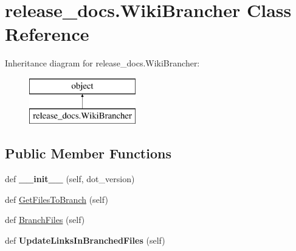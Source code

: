 \hypertarget{classrelease__docs_1_1_wiki_brancher}{}\section{release\+\_\+docs.\+Wiki\+Brancher Class Reference}
\label{classrelease__docs_1_1_wiki_brancher}
Inheritance diagram for release\+\_\+docs.\+Wiki\+Brancher\+:\begin{figure}[H]
\begin{center}
\leavevmode
\includegraphics[height=2.000000cm]{classrelease__docs_1_1_wiki_brancher}
\end{center}
\end{figure}
\subsection*{Public Member Functions}
\begin{DoxyCompactItemize}
\item 
\mbox{\label{classrelease__docs_1_1_wiki_brancher_a344b32e2b65f0e8bab9fbf1e670d33fd}} 
def {\bfseries \+\_\+\+\_\+init\+\_\+\+\_\+} (self, dot\+\_\+version)
\item 
def \mbox{\hyperlink{classrelease__docs_1_1_wiki_brancher_a05fc4282f501fb0210ecb33fd1d209a6}{Get\+Files\+To\+Branch}} (self)
\item 
def \mbox{\hyperlink{classrelease__docs_1_1_wiki_brancher_a5ef284f7e1742f465ecd0c14d2667327}{Branch\+Files}} (self)
\item 
\mbox{\label{classrelease__docs_1_1_wiki_brancher_aa0bc4b1b78426fe7a8496d570b540f1d}} 
def {\bfseries Update\+Links\+In\+Branched\+Files} (self)
\end{DoxyCompactItemize}
